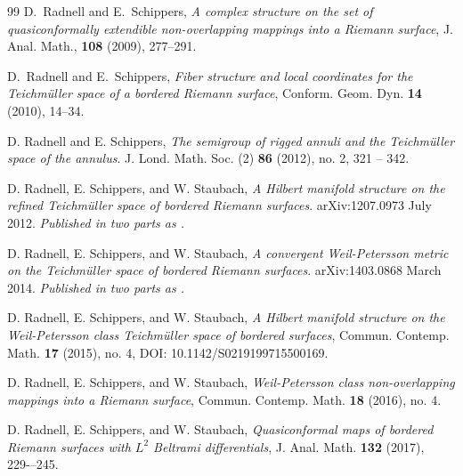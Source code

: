 \documentclass[12pt]{amsart}
\theoremstyle{plain}
\theoremstyle{definition}
\theoremstyle{remark}
\numberwithin{equation}{section} %
\numberwithin{figure}{section} %
\begin{document}
\begin{thebibliography}{99}
 D.~Radnell and E.~Schippers, {\it A complex structure on the set of quasiconformally extendible non-overlapping mappings into a Riemann surface}, J. Anal. Math., \textbf{108} (2009), 277--291.

D.~Radnell and E.~Schippers, {\it Fiber structure and local coordinates for the Teichm\"uller space of a bordered Riemann surface}, Conform. Geom. Dyn. {\bf{14}} (2010), 14--34.


 D. Radnell and E. Schippers, {\it The semigroup of rigged annuli and the Teichm\"uller space of the annulus}. J. Lond. Math. Soc. (2) {\bf 86} (2012), no. 2, 321 -- 342.


 D. Radnell, E. Schippers, and W. Staubach, {\it A Hilbert manifold structure on the refined Teichm\"uller space of bordered Riemann surfaces}.  	arXiv:1207.0973 July 2012. 
{\it Published in two parts as \cite{RSS_Filbert2,RSS_Filbert1}.}

 D. Radnell, E. Schippers, and W. Staubach,
{\it A convergent Weil-Petersson metric on the Teichmüller space of bordered Riemann surfaces}.  	arXiv:1403.0868 March 2014. 
{\it Published in two parts as \cite{RSS_WP1,RSS_WP2}.}


 D. Radnell, E. Schippers, and W. Staubach, {\it A Hilbert
 manifold structure on the Weil-Petersson class Teichm\"uller space of bordered surfaces}, Commun. Contemp. Math. \textbf{17} (2015), no. 4, DOI: 10.1142/S0219199715500169.

 D. Radnell, E. Schippers, and W. Staubach, {\it Weil-Petersson class
non-overlapping mappings into a Riemann surface},  Commun. Contemp. Math. {\bf 18} (2016), no. 4. %





 D. Radnell, E. Schippers, and W. Staubach, \textit{Quasiconformal maps of bordered Riemann surfaces with $L^2$ Beltrami differentials}, J. Anal. Math. {\bf 132} (2017), 229-–245. %


\end{thebibliography}
\end{document}
